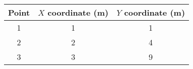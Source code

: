 \begin{tabular}[12pt]{|c|c|c|}
\hline
{Point} & {$X$ coordinate (m)} & {$Y$ coordinate (m) }\\ \hline
1 & 1 & 1 \\ \hline
2 & 2 & 4 \\ \hline
3 & 3 & 9 \\ \hline
\end{tabular}